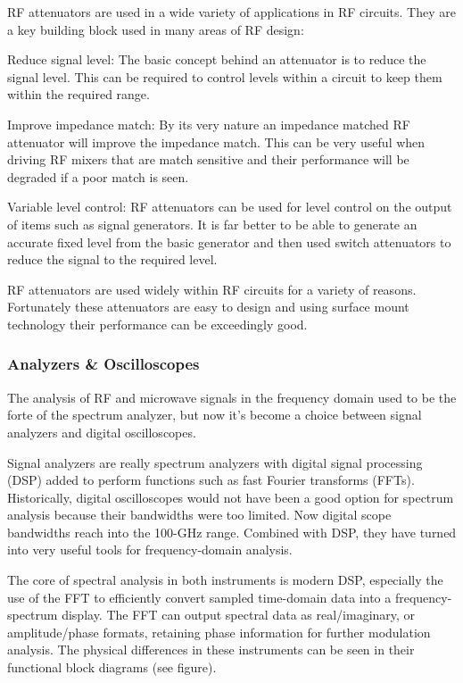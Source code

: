 	RF attenuators are used in a wide variety of applications in RF circuits. They are a key building block used in many areas of RF design:

Reduce signal level:   The basic concept behind an attenuator is to reduce the signal level. This can be required to control levels within a circuit to keep them within the required range.
	
	Improve impedance match:   By its very nature an impedance matched RF attenuator will improve the impedance match. This can be very useful when driving RF mixers that are match sensitive and their performance will be degraded if a poor match is seen.
	
	Variable level control:   RF attenuators can be used for level control on the output of items such as signal generators. It is far better to be able to generate an accurate fixed level from the basic generator and then used switch attenuators to reduce the signal to the required level.

	RF attenuators are used widely within RF circuits for a variety of reasons. Fortunately these attenuators are easy to design and using surface mount technology their performance can be exceedingly good.

\subsubsection{Analyzers \& Oscilloscopes}

	The analysis of RF and microwave signals in the frequency domain used to be the forte of the spectrum analyzer, but now it’s become a choice between signal analyzers and digital oscilloscopes. 

	Signal analyzers are really spectrum analyzers with digital signal processing (DSP) added to perform functions such as fast Fourier transforms (FFTs). Historically, digital oscilloscopes would not have been a good option for spectrum analysis because their bandwidths were too limited. Now digital scope bandwidths reach into the 100-GHz range. Combined with DSP, they have turned into very useful tools for frequency-domain analysis.


	The core of spectral analysis in both instruments is modern DSP, especially the use of the FFT to efficiently convert sampled time-domain data into a frequency-spectrum display. The FFT can output spectral data as real/imaginary, or amplitude/phase formats, retaining phase information for further modulation analysis. The physical differences in these instruments can be seen in their functional block diagrams (see figure).



